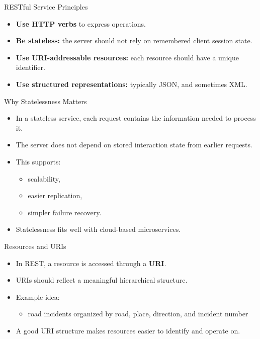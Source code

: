 \begin{frame}{RESTful Service Principles}
\begin{itemize}
    \item \textbf{Use HTTP verbs} to express operations.
    \item \textbf{Be stateless:} the server should not rely on remembered client session state.
    \item \textbf{Use URI-addressable resources:} each resource should have a unique identifier.
    \item \textbf{Use structured representations:} typically JSON, and sometimes XML.
\end{itemize}
\end{frame}

\begin{frame}{Why Statelessness Matters}
\begin{itemize}
    \item In a stateless service, each request contains the information needed to process it.
    \item The server does not depend on stored interaction state from earlier requests.
    \item This supports:
    \begin{itemize}
        \item scalability,
        \item easier replication,
        \item simpler failure recovery.
    \end{itemize}
    \item Statelessness fits well with cloud-based microservices.
\end{itemize}
\end{frame}

\begin{frame}{Resources and URIs}
\begin{itemize}
    \item In REST, a resource is accessed through a \textbf{URI}.
    \item URIs should reflect a meaningful hierarchical structure.
    \item Example idea:
    \begin{itemize}
        \item road incidents organized by road, place, direction, and incident number
    \end{itemize}
    \item A good URI structure makes resources easier to identify and operate on.
\end{itemize}
\end{frame}

